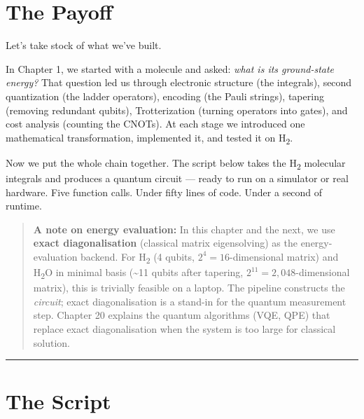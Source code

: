 \documentclass[
  11pt,
  oneside]{book}
\begin{document}
\section{The Payoff}\label{the-payoff}

Let's take stock of what we've built.

In Chapter 1, we started with a molecule and asked: \emph{what is its
ground-state energy?} That question led us through electronic structure
(the integrals), second quantization (the ladder operators), encoding
(the Pauli strings), tapering (removing redundant qubits),
Trotterization (turning operators into gates), and cost analysis
(counting the CNOTs). At each stage we introduced one mathematical
transformation, implemented it, and tested it on H\textsubscript{2}.

Now we put the whole chain together. The script below takes the H\textsubscript{2}
molecular integrals and produces a quantum circuit --- ready to run on a
simulator or real hardware. Five function calls. Under fifty lines of
code. Under a second of runtime.

\begin{quote}
\textbf{A note on energy evaluation:} In this chapter and the next, we
use \textbf{exact diagonalisation} (classical matrix eigensolving) as
the energy-evaluation backend. For H\textsubscript{2} (4 qubits,
\(2^4 = 16\)-dimensional matrix) and H\textsubscript{2}O in minimal basis
(\textasciitilde11 qubits after tapering,
\(2^{11} = 2{,}048\)-dimensional matrix), this is trivially feasible on
a laptop. The pipeline constructs the \emph{circuit}; exact
diagonalisation is a stand-in for the quantum measurement step. Chapter
20 explains the quantum algorithms (VQE, QPE) that replace exact
diagonalisation when the system is too large for classical solution.
\end{quote}

\begin{center}\rule{0.5\linewidth}{0.5pt}\end{center}

\section{The Script}\label{the-script}
\end{document}
